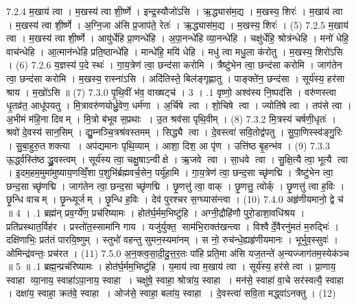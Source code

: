 7.2.4
म॒खाय॑ त्वा । म॒खस्य॑ त्वा शी॒र्ष्णे । इन्द्र॒स्यौजो॑ऽसि । ऋ॒द्ध्यास॑म॒द्य । म॒खस्य॒ शिरः॑ । म॒खाय॑ त्वा । म॒खस्य॑ त्वा शी॒र्ष्णे । अ॒ग्नि॒जा अ॑सि प्र॒जाप॑ते॒ रेतः॑ । ऋ॒द्ध्यास॑म॒द्य । म॒खस्य॒ शिरः॑ । (5)
7.2.5
म॒खाय॑ त्वा । म॒खस्य॑ त्वा शी॒र्ष्णे । आयु॑र्धेहि प्रा॒णन्धे॑हि । अ॒पा॒नन्धे॑हि व्या॒नन्धे॑हि । चक्षु॑र्धेहि॒ श्रोत्र॑न्धेहि । मनो॑ धेहि॒ वाच॑न्धेहि । आ॒त्मान॑न्धेहि प्रति॒ष्ठान्धे॑हि । मान्धे॑हि॒ मयि॑ धेहि । मधु॑ त्वा मधु॒ला क॑रोतु । म॒खस्य॒ शिरो॑ऽसि । (6)
7.2.6
य॒ज्ञस्य॑ प॒दे स्थः॑ । गा॒य॒त्रेण॑ त्वा॒ छन्द॑सा करोमि । त्रैष्टु॑भेन त्वा॒ छन्द॑सा करोमि । जाग॑तेन त्वा॒ छन्द॑सा करोमि । म॒खस्य॒ रास्ना॑ऽसि । अदि॑तिस्ते॒ बिल॑ङ्गृह्णातु । पाङ्क्ते॑न॒ छन्द॑सा । सूर्य॑स्य॒ हर॑सा श्राय । म॒खो॑ऽसि ॥ (7)
7.3.0
पृ॒थि॒वीं भ॑व॒ वाख्षट्च॑ । 3 ।
.1
वृष्णो॒ अश्व॑स्य नि॒ष्पद॑सि । वरु॑णस्त्वा धृ॒तव्र॑त॒ आधू॑पयतु । मि॒त्रावरु॑णयोर्ध्रु॒वेण॒ धर्म॑णा । अ॒र्चिषे त्वा । शो॒चिषे त्वा । ज्योति॑षे त्वा । तप॑से त्वा । अ॒भीमं म॑हि॒ना दिवम् । मि॒त्रो ब॑भूव स॒प्रथाः । उ॒त श्रव॑सा पृथि॒वीम् । (8)
7.3.2
मि॒त्रस्य॑ चर्\mbox{}षणी॒धृतः॑ । श्रवो॑ दे॒वस्य॑ सान॒सिम् । द्यु॒म्नञ्चि॒त्रश्र॑वस्तमम् । सिद्ध्यै त्वा । दे॒वस्त्वा॑ सवि॒तोद्व॑पतु । सु॒पा॒णिस्स्व॑ङ्गु॒रिः । सु॒बा॒हुरु॒त शक्त्या । अप॑द्यमानः पृथि॒व्याम् । आशा॒ दिश॒ आ पृ॑ण । उत्ति॑ष्ठ बृ॒हन्भ॑व । (9)
7.3.3
ऊ॒र्द्ध्वस्ति॑ष्ठ द्ध्रु॒वस्त्वम् । सूर्य॑स्य त्वा॒ चक्षु॒षाऽन्वीक्षे । ऋ॒जवे त्वा । सा॒धवे त्वा । सु॒क्षि॒त्यै त्वा॒ भूत्यै त्वा । इ॒दम॒हम॒मुमा॑मुष्याय॒णव्विँ॒शा प॒शुभि॑र्ब्रह्मवर्च॒सेन॒ पर्यू॑हामि । गा॒य॒त्रेण॑ त्वा॒ छन्द॒सा च्छृ॑णद्मि । त्रैष्टु॑भेन त्वा॒ छन्द॒सा च्छृ॑णद्मि । जाग॑तेन त्वा॒ छन्द॒सा च्छृ॑णद्मि । छृ॒णत्तु॑ त्वा॒ वाक् । छृ॒णत्तु॒ त्वोर्क् । छृ॒णत्तु॑ त्वा ह॒विः । छृ॒न्धि वाचम् । छृ॒न्ध्यूर्जम् । छृ॒न्धि ह॒विः । देव॑ पुरश्चर स॒ग्घ्यास॑न्त्वा । (10)
7.4.0
अहृ॑णीयमानो॒ द्वे च॑ ॥ 4 ।
.1
ब्रह्म॑न् प्रव॒र्ग्ये॑ण॒ प्रच॑रिष्यामः । होत॑र्घ॒र्मम॒भिष्टु॑हि । अग्नी॒द्रौहि॑णौ पुरो॒डाशा॒वधि॑श्रय । प्रति॑प्रस्थात॒र्विह॑र । प्रस्तो॑त॒स्सामा॑नि गाय । यजु॑र्युक्त॒ साम॑भि॒राक्त॑खन्त्वा । विश्वैर्दे॒वैरनु॑मतं म॒रुद्भिः॑ । दक्षि॑णाभिः॒ प्रत॑तं पारयि॒ष्णुम् । स्तुभो॑ वहन्तु सुमन॒स्यमा॑नम् । स नो॒ रुच॑न्धे॒ह्यहृ॑णीयमानः । भूर्भुव॒स्सुवः॑ । ओमिन्द्र॑वन्तः॒ प्रच॑रत । (11)
7.5.0
अ॒न॒क्त्व॒सा॒दी॒दु॒त्त॒र॒तः पा॑हि प्रति॒मा अ॑सि यज॒तन्ते॑ अ॒न्यज्जाग॑तम॒स्येक॑ञ्च ॥ 5 ॥
.1
ब्रह्म॒न्प्रच॑रिष्यामः । होत॑र्घ॒र्मम॒भिष्टु॑हि । य॒माय॑ त्वा म॒खाय॑ त्वा । सूर्य॑स्य॒ हर॑से त्वा । प्रा॒णाय॒ स्वाहा व्या॒नाय॒ स्वाहा॑ऽपा॒नाय॒ स्वाहा । चक्षु॑षे॒ स्वाहा॒ श्रोत्रा॑य॒ स्वाहा । मन॑से॒ स्वाहा॑ वा॒चे सर॑स्वत्यै॒ स्वाहा । दक्षा॑य॒ स्वाहा॒ क्रत॑वे॒ स्वाहा । ओज॑से॒ स्वाहा॒ बला॑य॒ स्वाहा । दे॒वस्त्वा॑ सवि॒ता मद्ध्वा॑ऽनक्तु । (12)
